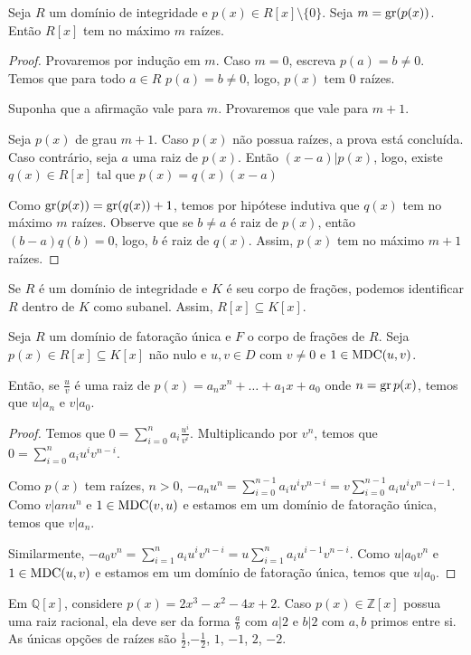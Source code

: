 \begin{prop}
Seja $R$ um domínio de integridade e $p(x)\in R[x]\setminus \{0\}$. Seja $m=\operatorname{gr} (p(x))$. Então $R[x]$ tem no máximo $m$ raízes.
\end{prop}
\begin{proof}
    Provaremos por indução em $m$.
    Caso $m=0$, escreva $p(a)=b\neq 0$. Temos que para todo $a \in R$ $p(a)=b\neq 0$, logo, $p(x)$ tem $0$ raízes.

    Suponha que a afirmação vale para $m$. Provaremos que vale para $m+1$.
    
    Seja $p(x)$ de grau $m+1$. Caso $p(x)$ não possua raízes, a prova está concluída. Caso contrário, seja $a$ uma raiz de $p(x)$. Então $(x-a)|p(x)$, logo, existe $q(x) \in R[x]$ tal que $p(x)=q(x)(x-a)$

    Como $\operatorname{gr}(p(x))=\operatorname{gr}(q(x))+1$, temos por hipótese indutiva que $q(x)$ tem no máximo $m$ raízes. Observe que se $b\neq a$ é raiz de $p(x)$, então $(b-a)q(b)=0$, logo, $b$ é raiz de $q(x)$. Assim, $p(x)$ tem no máximo $m+1$ raízes.
\end{proof}

Se $R$ é um domínio de integridade e $K$ é seu corpo de frações, podemos identificar $R$ dentro de $K$ como subanel. Assim, $R[x]\subseteq K[x]$.
\begin{prop}
Seja $R$ um domínio de fatoração única e $F$ o corpo de frações de $R$. Seja $p(x)\in R[x]\subseteq K[x]$ não nulo e $u, v \in D$ com $v \neq 0$ e $1\in \operatorname{MDC}(u, v)$.

Então, se $\frac{u}{v}$ é uma raiz de $p(x)=a_nx^n+\dots+a_1x+a_0$ onde $n=\operatorname{gr} p(x)$, temos que $u|a_n$ e $v|a_0$.
\end{prop}
\begin{proof}
    Temos que $0=\sum_{i=0}^na_i \frac{u^i}{v^i}$. Multiplicando por $v^n$, temos que $0=\sum_{i=0}^n a_i u^iv^{n-i}$.

    Como $p(x)$ tem raízes, $n>0$, $-a_nu^n=\sum_{i=0}^{n-1}a_iu^iv^{n-i}=v\sum_{i=0}^{n-1}a_iu^iv^{n-i-1}$. Como $v|anu^n$ e $1\in \operatorname{MDC}(v, u)$ e estamos em um domínio de fatoração única, temos que $v|a_n$.

    Similarmente, $-a_0v^n=\sum_{i=1}^n a_i u^iv^{n-i}=u\sum_{i=1}^n a_i u^{i-1}v^{n-i}$. Como $u|a_0v^n$ e $1\in \operatorname{MDC}(u, v)$ e estamos em um domínio de fatoração única, temos que $u|a_0$.
\end{proof}


\begin{exemplo}
Em $\mathbb Q[x]$, considere $p(x)=2x^3- x^2 - 4 x  + 2$. Caso $p(x)\in \mathbb Z[x]$ possua uma raiz racional, ela deve ser da forma $\frac{a}{b}$ com $a|2$ e $b|2$ com $a, b$ primos entre si. As únicas opções de raízes são $\frac{1}{2}$,$-\frac{1}{2}$, $1$, $-1$, $2$, $-2$.
\end{exemplo}
